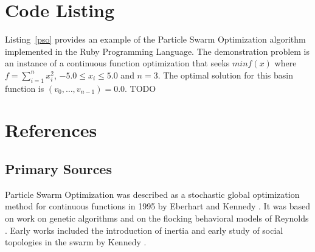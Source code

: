 \documentclass[a4paper, 11pt]{article}
\begin{document}
\section{Code Listing}
\label{sec:code}
Listing~\ref{pso} provides an example of the Particle Swarm Optimization algorithm implemented in the Ruby Programming Language. 
The demonstration problem is an instance of a continuous function optimization that seeks $min f(x)$ where $f=\sum_{i=1}^n x_{i}^2$, $-5.0\leq x_i \leq 5.0$ and $n=3$. The optimal solution for this basin function is $(v_0,\ldots,v_{n-1})=0.0$.
TODO




\section{References}
\label{sec:references}

% 
% 
\subsection{Primary Sources}
Particle Swarm Optimization was described as a stochastic global optimization method for continuous functions in 1995 by Eberhart and Kennedy \cite{Eberhart1995, Kennedy1995}. It was based on work on genetic algorithms and on the flocking behavioral models of Reynolds \cite{Reynolds1987}.
Early works included the introduction of inertia \cite{Shi1998} and early study of social topologies in the swarm by Kennedy \cite{Kennedy1999}. 
\end{document}
